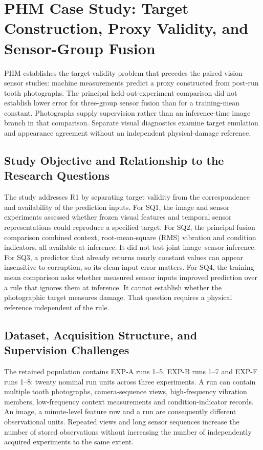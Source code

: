 \chapter{PHM Case Study: Target Construction, Proxy Validity, and Sensor-Group Fusion}
\label{ch:phm}
PHM establishes the target-validity problem that precedes the paired vision--sensor
studies: machine measurements predict a proxy constructed from post-run tooth
photographs. The principal held-out-experiment comparison did not establish lower error
for three-group sensor fusion than for a training-mean constant. Photographs supply
supervision rather than an inference-time image branch in that comparison. Separate
visual diagnostics examine target emulation and appearance agreement without an
independent physical-damage reference.

\section{Study Objective and Relationship to the Research Questions}
The study addresses R1 by separating target validity from the correspondence and
availability of the prediction inputs. For SQ1, the image and sensor experiments assessed whether frozen visual features and
temporal sensor representations could reproduce a specified target. For SQ2, the
principal fusion comparison combined context, root-mean-square (RMS) vibration and
condition indicators, all available at inference. It did not test joint image--sensor
inference. For SQ3, a predictor that already returns nearly constant values can appear
insensitive to corruption, so its clean-input error matters. For SQ4, the training-mean
comparison asks whether measured sensor inputs improved prediction over a rule that
ignores them at inference. It cannot establish whether the photographic target measures
damage. That question requires a physical reference independent of the rule.

\section{Dataset, Acquisition Structure, and Supervision Challenges}
The retained population contains EXP-A runs 1--5, EXP-B runs 1--7 and EXP-F runs 1--8:
twenty nominal run units across three experiments. A run can contain multiple tooth
photographs, camera-sequence views, high-frequency vibration members, low-frequency
context measurements and condition-indicator records. An image, a minute-level feature
row and a run are consequently different observational units. Repeated views and long
sensor sequences increase the number of stored observations without increasing the
number of independently acquired experiments to the same extent.

